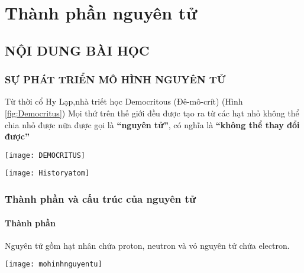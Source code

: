\section{Thành phần nguyên tử}
\subsection{NỘI DUNG BÀI HỌC}
\subsubsection{SỰ PHÁT TRIỂN MÔ HÌNH NGUYÊN TỬ}
\begin{hoplythuyet}
\begin{minipage}[htp!]{0.5\textwidth}
Từ thời cổ Hy Lạp,nhà triết học Democritous (Đê-mô-crít) (Hình \ref{fig:Democritus})
Mọi thứ trên thế giới đều được tạo ra từ các hạt nhỏ không thể chia nhỏ được nữa được gọi là \textbf{“nguyên tử”}, có nghĩa là \textbf{“không thể thay đổi được”}
\end{minipage}
\begin{minipage}[htp!]{0.5\textwidth}
\begin{center}
		\texttt{[image: DEMOCRITUS]}
\end{center}
\end{minipage}

\begin{center}
	\texttt{[image: Historyatom]}
\end{center}
\end{hoplythuyet}
\subsubsection{Thành phần và cấu trúc của nguyên tử}
\paragraph{Thành phần}
\begin{hoplythuyet}
	Nguyên tử gồm hạt nhân chứa proton, neutron và vỏ nguyên tử chứa electron.
	\begin{center}
		\texttt{[image: mohinhnguyentu]}
	\end{center}
\end{hoplythuyet}
